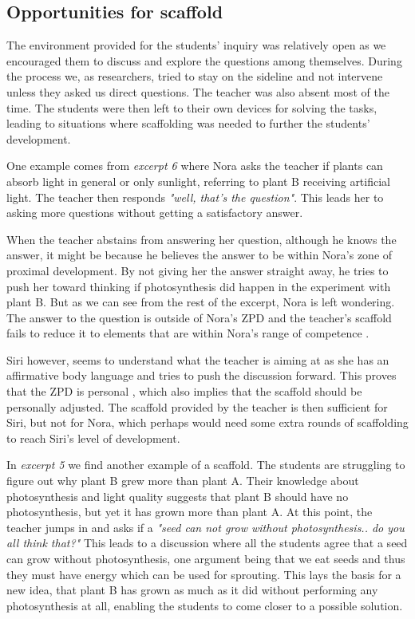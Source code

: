 \subsection{Opportunities for scaffold}
The environment provided for the students' inquiry was relatively open as we encouraged them to discuss and explore the questions among themselves. During the process we, as researchers, tried to stay on the sideline and not intervene unless they asked us direct questions. The teacher was also absent most of the time. The students were then left to their own devices for solving the tasks, leading to situations where scaffolding was needed to further the students' development. 

One example comes from \emph{excerpt 6} where Nora asks the teacher if plants can absorb light in general or only sunlight, referring to plant B receiving artificial light. The teacher then responds \emph{"well, that's the question"}. This leads her to asking more questions without getting a satisfactory answer. 

When the teacher abstains from answering her question, although he knows the answer, it might be because he believes the answer to be within Nora's zone of proximal development. By not giving her the answer straight away, he tries to push her toward thinking if photosynthesis did happen in the experiment with plant B. But as we can see from the rest of the excerpt, Nora is left wondering. The answer to the question is outside of Nora's ZPD and the teacher's scaffold fails to reduce it to elements that are within Nora's range of competence \citep{wood1976role}. 

Siri however, seems to understand what the teacher is aiming at as she has an affirmative body language and tries to push the discussion forward. This proves that the ZPD is personal \citep{vygotskiui1978mind}, which also implies that the scaffold should be personally adjusted. The scaffold provided by the teacher is then sufficient for Siri, but not for Nora, which perhaps would need some extra rounds of scaffolding to reach Siri's level of development. 

In \emph{excerpt 5} we find another example of a scaffold. The students are struggling to figure out why plant B grew more than plant A. Their knowledge about photosynthesis and light quality suggests that plant B should have no photosynthesis, but yet it has grown more than plant A. At this point, the teacher jumps in and asks if a \emph{"seed can not grow without photosynthesis.. do you all think that?"} This leads to a discussion where all the students agree that a seed can grow without photosynthesis, one argument being that we eat seeds and thus they must have energy which can be used for sprouting. This lays the basis for a new idea, that plant B has grown as much as it did without performing any photosynthesis at all, enabling the students to come closer to a possible solution. 


